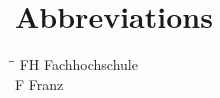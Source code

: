 \section*{Abbreviations}

\begin{tabbing}
\hspace*{4cm}\=\hspace*{3cm}\= \kill
FH    \> Fachhochschule\\
F    \> Franz
\end{tabbing}